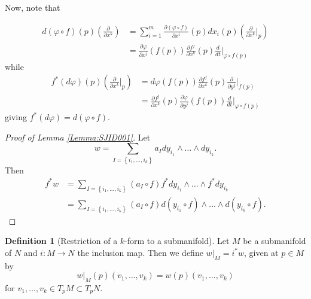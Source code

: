 \documentclass[reqno]{amsart}
\theoremstyle{definition}
\newtheorem{definition}[theorem]{Definition}
\theoremstyle{remark}
\begin{document}
      Now, note that
      

      \begin{align*}
          d \left( \varphi \circ f \right)(p) 
          \left( \frac{\partial}{\partial x^{k}} \right) 
          &= \sum_{i=1}^{m}
          \frac{\partial (\varphi \circ f )}{\partial x^{i}}(p) 
          dx_i (p) \left( \frac{\partial}{\partial x^{k}}|_p
          \right) \\
          &= 
          \frac{\partial \varphi  }{\partial x^{j}} (f(p))
          \frac{\partial f^{j}}{\partial x^{k}}(p)
          \frac{d}{dt}|_{\varphi \circ f(p)}
      \end{align*}
      while
      \begin{align*}
          f^{*}(d\varphi ) (p) \left( \frac{\partial}{\partial
          x^{k}}|_p \right) 
          &= d\varphi (f(p))
           \frac{\partial f^{j}}{\partial 
          x^{k}} (p)
          \frac{\partial }{\partial y^{j}}|_{f(p)}\\
          &= \frac{\partial f^{j}}{\partial x^{k}}(p)
          \frac{\partial \varphi }{\partial y^{j}}(f(p))
          \frac{d}{dt}|_{\varphi \circ f(p)}
      \end{align*}
      giving $f^{*}(d\varphi )
      = d \left( \varphi \circ f \right) $.

      \begin{proof}[Proof of Lemma \ref{Lemma:SJID001}]
          Let
          \[
          w = \sum_{I = \left\{ i_1,\ldots,i_k \right\} }
          a_I dy_{i_1} \wedge \ldots \wedge
          dy_{i_k}.
          \] 
          Then
          \begin{align*}
              f^{*}w &=
              \sum_{I = \left\{ i_1,\ldots,i_k \right\} }
              \left( a_I \circ f \right) 
              f^{*}dy_{i_1} \wedge \ldots \wedge
              f^{*} dy_{i_k}\\
                     &= 
                     \sum_{I = \left\{ i_1,\ldots,i_k \right\} }
                     \left( a_I \circ f \right) 
                     d \left( y_{i_1} \circ f \right) 
                     \wedge \ldots \wedge
                     d\left( y_{i_k} \circ f \right) .
          \end{align*}
      \end{proof}

      \begin{definition}[Restriction of a $k$-form to a submanifold]
          Let
          $M$ be a submanifold of $N$ and
          $i \colon M \to N$ the inclusion map. Then
          we define
          $w|_M = i^{*}w$, given at $p \in M$ by
          \[
          w|_M(p) (v_1,\ldots, v_k) = 
          w(p) (v_1,\ldots, v_k)
          \] 
          for $v_1,\ldots, v_k \in T_pM \subset T_pN$.
      \end{definition}
\end{document}
